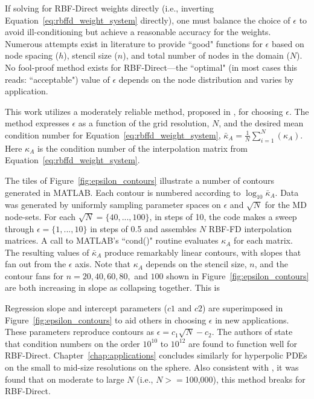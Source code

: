 \documentclass[11pt]{report}
\begin{document}
{%

If solving for RBF-Direct weights directly (i.e., inverting Equation~\ref{eq:rbffd_weight_system} directly), one must balance the choice of $\epsilon$ to avoid ill-conditioning but achieve a reasonable accuracy for the weights. Numerous attempts exist in literature to provide ``good" functions for $\epsilon$ based on node spacing ($h$), stencil size ($n$), and total number of nodes in the domain ($N$). 
No fool-proof method exists for RBF-Direct---the ``optimal" (in most cases this reads: ``acceptable") value of $\epsilon$ depends on the node distribution and varies by application. 

This work utilizes a moderately reliable method, proposed in \cite{FlyerLehto11}, for choosing $\epsilon$. The method expresses $\epsilon$ as a function of the grid resolution, $N$, and the desired mean condition number for Equation~\ref{eq:rbffd_weight_system}, $\bar{\kappa}_A = \frac{1}{N} \sum_{i=1}^N(\kappa_A)$. Here $\kappa_A$ is the condition number of the interpolation matrix from Equation~\ref{eq:rbffd_weight_system}. 

The tiles of Figure~\ref{fig:epsilon_contours} illustrate a number of contours generated in MATLAB. Each contour is numbered according to $\log_{10}\bar{\kappa}_A$. Data was generated by uniformly sampling parameter spaces on $\epsilon$ and $\sqrt{N}$ for the MD node-sets. For each $\sqrt{N} = \{40, ..., 100\}$, in steps of 10, the code makes a sweep through $\epsilon = \{1, ..., 10\}$ in steps of 0.5 and assembles $N$ RBF-FD interpolation matrices. A call to MATLAB's ``cond()" routine evaluates $\kappa_A$ for each matrix. The resulting values of $\bar{\kappa}_A$ produce remarkably linear contours, with slopes that fan out from the $\epsilon$ axis. Note that $\kappa_A$ depends on the stencil size, $n$, and the contour fans for $n=20, 40, 60, 80,$ and $100$ shown in Figure~\ref{fig:epsilon_contours} are both increasing in slope as collapsing together. This is 


Regression slope and intercept parameters ($c1$ and $c2$) are superimposed in Figure~\ref{fig:epsilon_contours} to aid others in choosing $\epsilon$ in new applications. These parameters reproduce contours as $\epsilon = c_1 \sqrt{N} - c_2$.  The authors of \cite{FlyerLehto11} state that condition numbers on the order $10^10$ to $10^12$ are found to function well for RBF-Direct. Chapter~\ref{chap:applications} concludes similarly for hyperpolic PDEs on the small to mid-size resolutions on the sphere. Also consistent with \cite{FlyerLehto11}, it was found that on moderate to large $N$ (i.e., $N >= $100,000), this method breaks for RBF-Direct. 

}
\end{document}
